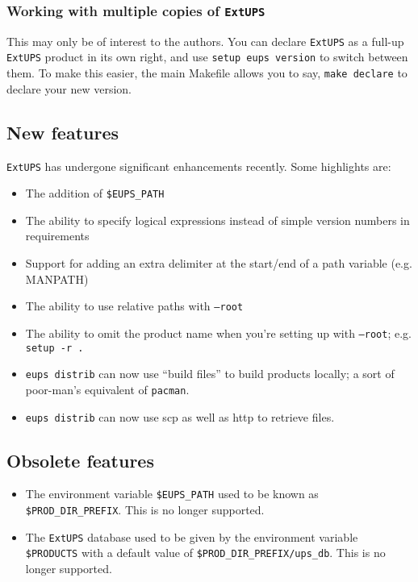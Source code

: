 \documentclass{article}
\newcommand{\code}[1]{\texttt{#1}}
\newcommand{\eups}{\code{ExtUPS}}
\newcommand{\pacman}{\code{pacman}}
\begin{document}
\subsubsection{Working with multiple copies of \eups}

This may only be of interest to the authors.  You can declare \eups{} as a full-up
\eups{} product in its own right, and use \code{setup eups version} to switch
between them.  To make this easier, the main Makefile allows you to say,
\code{make declare} to declare your new version.

\subsection{New features}

\eups{} has undergone significant enhancements recently.  Some
highlights are:

\begin{itemize}
  \item
    The addition of \code{\$EUPS\_PATH}

  \item
    The ability to specify logical expressions instead
    of simple version numbers in requirements

  \item
    Support for adding an extra delimiter at the
    start/end of a path variable (e.g. MANPATH)

  \item
    The ability to use relative paths with \code{--root}

  \item
    The ability to omit the product name when you're
    setting up with \code{--root}; e.g. \code{setup -r .}

  \item
    \code{eups distrib} can now use ``build files'' to
    build products locally;  a sort of poor-man's equivalent
    of \pacman{}.

  \item
    \code{eups distrib} can now use scp as well as http to
    retrieve files.
\end{itemize}

\subsection{Obsolete features}

\begin{itemize}
  \item The environment variable \code{\$EUPS\_PATH} used to be known
  as \code{\$PROD\_DIR\_PREFIX}. This is no longer supported.

  \item The \eups{} database used to be given by the environment variable \code{\$PRODUCTS}
    with a default value of \code{\$PROD\_DIR\_PREFIX/ups\_db}. This is no longer supported.
\end{itemize}
\end{document}
